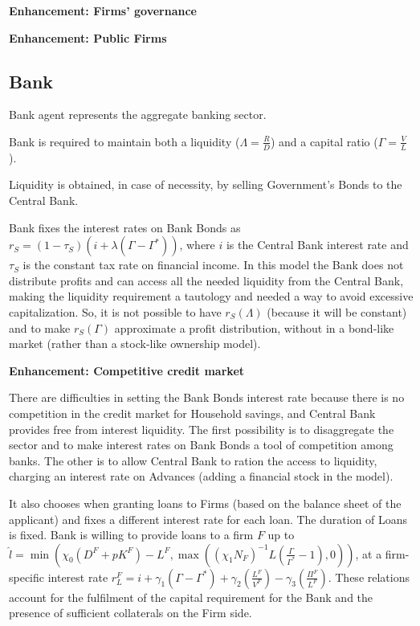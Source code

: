 \documentclass[a4paper, headings=standardclasses]{scrartcl}
\newenvironment{enh}[1][]{\begin{framed}\noindent\textbf{Enhancement: #1}\par}{\end{framed}}
\begin{document}
\begin{enh}[Firms' governance]

\end{enh}

\begin{enh}[Public Firms]
\end{enh}


\subsection{Bank}
Bank agent represents the aggregate banking sector.

Bank is required to maintain both a liquidity ($\Lambda = \frac{R}{D}$) and a capital ratio ($\Gamma = \frac{V}{L}$).

Liquidity is obtained, in case of necessity, by selling Government's Bonds to the Central Bank.

Bank fixes the interest rates on Bank Bonds as $r_S = (1 - \tau_S) (i + \lambda(\Gamma - \Gamma^*))$, where $i$ is the Central Bank interest rate and $\tau_S$ is the constant tax rate on financial income. In this model the Bank does not distribute profits and can access all the needed liquidity from the Central Bank, making the liquidity requirement a tautology and needed a way to avoid excessive capitalization. So, it is not possible to have $r_S(\Lambda)$ (because it will be constant) and to make $r_S(\Gamma)$ approximate a profit distribution, without in a bond-like market (rather than a stock-like ownership model).

\begin{enh}[Competitive credit market]
	There are difficulties in setting the Bank Bonds interest rate because there is no competition in the credit market for Household savings, and Central Bank provides free from interest liquidity.
	The first possibility is to disaggregate the sector and to make interest rates on Bank Bonds a tool of competition among banks.
	The other is to allow Central Bank to ration the access to liquidity, charging an interest rate on Advances (adding a financial stock in the model).
\end{enh}

It also chooses when granting loans to Firms (based on the balance sheet of the applicant) and fixes a different interest rate for each loan. The duration of Loans is fixed.
Bank is willing to provide loans to a firm $F$ up to $\hat{l} = \min (\chi_0 (D^F+pK^F) - L^F, \max((\chi_1 N_F)^{-1} L (\frac{\Gamma}{\Gamma^*}-1),0))$, at a firm-specific interest rate $r_L^F = i + \gamma_1 (\Gamma - \Gamma^*) + \gamma_2 (\frac{L^F}{V^F}) - \gamma_3 (\frac{\Pi^F}{L^F})$.
These relations account for the fulfilment of the capital requirement for the Bank and the presence of sufficient collaterals on the Firm side.
\end{document}
